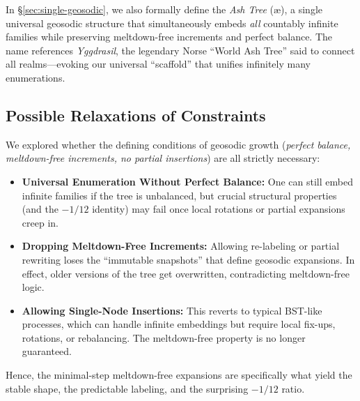 \documentclass[acmsmall]{acmart}
\theoremstyle{definition}
\theoremstyle{remark}
\begin{document}
In \S\ref{sec:single-geosodic}, we also formally define the \emph{Ash Tree} (\ae),
a single universal geosodic structure that simultaneously embeds
\emph{all} countably infinite families while preserving meltdown-free increments
and perfect balance.  The name references \emph{Yggdrasil}, the legendary Norse
“World Ash Tree” said to connect all realms—evoking our universal “scaffold”
that unifies infinitely many enumerations.

\subsection*{Possible Relaxations of Constraints}
We explored whether the defining conditions of geosodic growth
(\emph{perfect balance, meltdown-free increments, no partial insertions})
are all strictly necessary:

\begin{itemize}
  \item \textbf{Universal Enumeration Without Perfect Balance:}
    One can still embed infinite families if the tree is unbalanced,
    but crucial structural properties (and the $-1/12$ identity)
    may fail once local rotations or partial expansions creep in.
  \item \textbf{Dropping Meltdown-Free Increments:}
    Allowing re-labeling or partial rewriting loses the “immutable
    snapshots” that define geosodic expansions. In effect, older versions
    of the tree get overwritten, contradicting meltdown-free logic.
  \item \textbf{Allowing Single-Node Insertions:}
    This reverts to typical BST-like processes, which can handle infinite
    embeddings but require local fix-ups, rotations, or rebalancing. 
    The meltdown-free property is no longer guaranteed.
\end{itemize}

Hence, the minimal-step meltdown-free expansions are specifically what yield
the stable shape, the predictable labeling, and the surprising $-1/12$ ratio.
\end{document}
